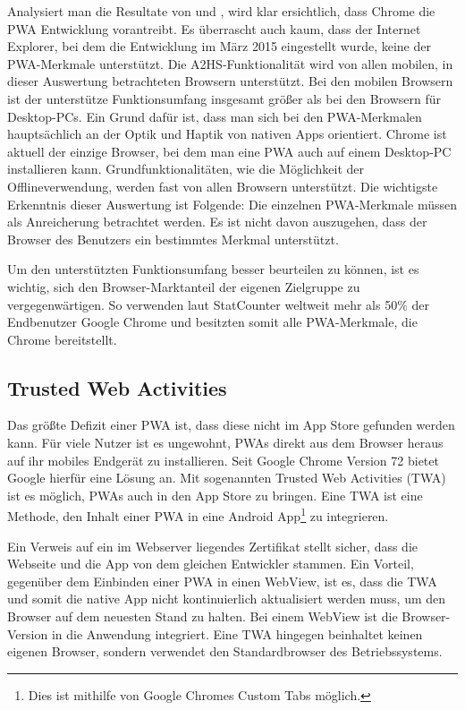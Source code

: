 Analysiert man die Resultate von  und
, wird klar ersichtlich, dass Chrome
die PWA Entwicklung vorantreibt. Es überrascht auch kaum, dass der Internet Explorer,
bei dem die Entwicklung im März 2015 eingestellt wurde, \cite{HeiseInternetExplorer} keine der PWA-Merkmale
unterstützt. Die A2HS-Funktionalität wird von allen
mobilen, in dieser Auswertung betrachteten Browsern unterstützt.
Bei den mobilen Browsern ist der unterstütze Funktionsumfang insgesamt größer als
bei den Browsern für Desktop-PCs. Ein Grund dafür ist, dass man sich bei den PWA-Merkmalen
hauptsächlich an der Optik und Haptik von nativen Apps orientiert. Chrome ist aktuell
der einzige Browser, bei dem man eine PWA auch auf einem Desktop-PC installieren
kann. Grundfunktionalitäten, wie  die Möglichkeit der Offlineverwendung, werden fast von allen
Browsern unterstützt. Die wichtigste Erkenntnis dieser Auswertung ist Folgende: Die einzelnen
PWA-Merkmale müssen als Anreicherung betrachtet werden. Es ist nicht davon auszugehen, dass
der Browser des Benutzers ein bestimmtes Merkmal unterstützt.

Um den unterstützten Funktionsumfang besser beurteilen zu können, ist es wichtig,
sich den Browser-Marktanteil der eigenen Zielgruppe zu vergegenwärtigen.
So verwenden laut StatCounter weltweit mehr als 50\% der Endbenutzer Google Chrome und besitzten somit
alle PWA-Merkmale, die Chrome bereitstellt.\cite{StatCounterBrowserMarketShare}

\subsection{Trusted Web Activities}
\label{subsec:trustedwebactivities}
Das größte Defizit einer PWA ist, dass diese nicht im App Store gefunden werden kann.
Für viele Nutzer ist es ungewohnt, PWAs direkt aus dem Browser heraus auf ihr mobiles Endgerät zu installieren.
Seit Google Chrome Version 72 bietet Google hierfür eine Lösung an.
Mit sogenannten Trusted Web Activities (TWA) ist es möglich, PWAs auch in den App Store
zu bringen. Eine TWA ist eine Methode, den Inhalt einer PWA in eine Android App\footnote{Dies ist mithilfe von Google Chromes Custom Tabs möglich.}
zu integrieren.\cite{TrustedWebActivitiesGoogle}

Ein Verweis auf ein im Webserver liegendes Zertifikat stellt sicher,
dass die Webseite und die App von dem gleichen Entwickler
stammen. Ein Vorteil, gegenüber dem Einbinden einer PWA in einen WebView, ist es,
dass die TWA und somit die native App nicht kontinuierlich aktualisiert werden muss,
um den Browser auf dem neuesten Stand zu halten. Bei einem WebView ist die Browser-Version in
die Anwendung integriert. Eine TWA hingegen beinhaltet keinen eigenen Browser, sondern verwendet
den Standardbrowser des Betriebssystems.

